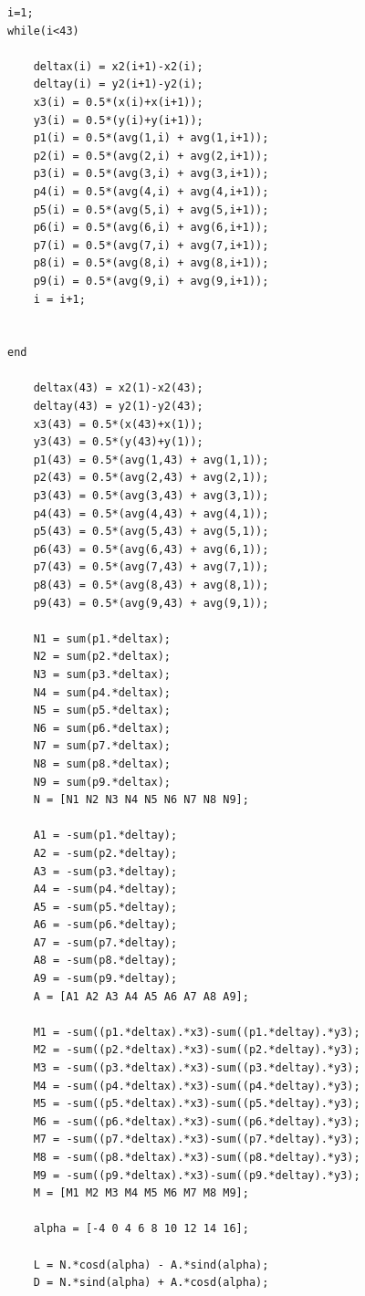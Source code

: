 \documentclass[12pt]{article}
\begin{document}
\begin{lstlisting}
i=1;
while(i<43)
    
    deltax(i) = x2(i+1)-x2(i);
    deltay(i) = y2(i+1)-y2(i);
    x3(i) = 0.5*(x(i)+x(i+1));
    y3(i) = 0.5*(y(i)+y(i+1));
    p1(i) = 0.5*(avg(1,i) + avg(1,i+1));
    p2(i) = 0.5*(avg(2,i) + avg(2,i+1));
    p3(i) = 0.5*(avg(3,i) + avg(3,i+1));
    p4(i) = 0.5*(avg(4,i) + avg(4,i+1));
    p5(i) = 0.5*(avg(5,i) + avg(5,i+1));
    p6(i) = 0.5*(avg(6,i) + avg(6,i+1));
    p7(i) = 0.5*(avg(7,i) + avg(7,i+1));
    p8(i) = 0.5*(avg(8,i) + avg(8,i+1));
    p9(i) = 0.5*(avg(9,i) + avg(9,i+1));
    i = i+1;
    
    
end

    deltax(43) = x2(1)-x2(43);
    deltay(43) = y2(1)-y2(43);
    x3(43) = 0.5*(x(43)+x(1));
    y3(43) = 0.5*(y(43)+y(1));
    p1(43) = 0.5*(avg(1,43) + avg(1,1));
    p2(43) = 0.5*(avg(2,43) + avg(2,1));
    p3(43) = 0.5*(avg(3,43) + avg(3,1));
    p4(43) = 0.5*(avg(4,43) + avg(4,1));
    p5(43) = 0.5*(avg(5,43) + avg(5,1));
    p6(43) = 0.5*(avg(6,43) + avg(6,1));
    p7(43) = 0.5*(avg(7,43) + avg(7,1));
    p8(43) = 0.5*(avg(8,43) + avg(8,1));
    p9(43) = 0.5*(avg(9,43) + avg(9,1));

    N1 = sum(p1.*deltax);
    N2 = sum(p2.*deltax);
    N3 = sum(p3.*deltax);
    N4 = sum(p4.*deltax);
    N5 = sum(p5.*deltax);
    N6 = sum(p6.*deltax);
    N7 = sum(p7.*deltax);
    N8 = sum(p8.*deltax);
    N9 = sum(p9.*deltax);
    N = [N1 N2 N3 N4 N5 N6 N7 N8 N9];
    
    A1 = -sum(p1.*deltay);
    A2 = -sum(p2.*deltay);
    A3 = -sum(p3.*deltay);
    A4 = -sum(p4.*deltay);
    A5 = -sum(p5.*deltay);
    A6 = -sum(p6.*deltay);
    A7 = -sum(p7.*deltay);
    A8 = -sum(p8.*deltay);
    A9 = -sum(p9.*deltay);
    A = [A1 A2 A3 A4 A5 A6 A7 A8 A9];

    M1 = -sum((p1.*deltax).*x3)-sum((p1.*deltay).*y3);
    M2 = -sum((p2.*deltax).*x3)-sum((p2.*deltay).*y3);
    M3 = -sum((p3.*deltax).*x3)-sum((p3.*deltay).*y3);
    M4 = -sum((p4.*deltax).*x3)-sum((p4.*deltay).*y3);
    M5 = -sum((p5.*deltax).*x3)-sum((p5.*deltay).*y3);
    M6 = -sum((p6.*deltax).*x3)-sum((p6.*deltay).*y3);
    M7 = -sum((p7.*deltax).*x3)-sum((p7.*deltay).*y3);
    M8 = -sum((p8.*deltax).*x3)-sum((p8.*deltay).*y3);
    M9 = -sum((p9.*deltax).*x3)-sum((p9.*deltay).*y3);
    M = [M1 M2 M3 M4 M5 M6 M7 M8 M9];
    
    alpha = [-4 0 4 6 8 10 12 14 16];
    
    L = N.*cosd(alpha) - A.*sind(alpha);
    D = N.*sind(alpha) + A.*cosd(alpha);
    

\end{lstlisting}
\end{document}
